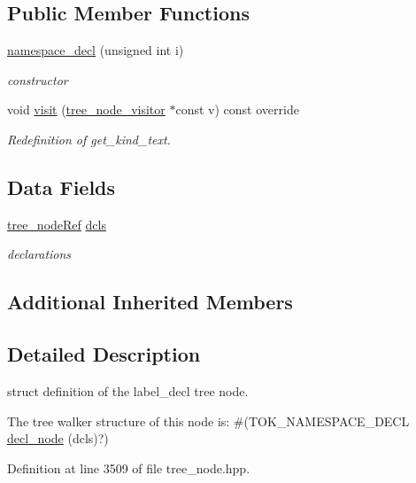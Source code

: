 \subsection*{Public Member Functions}
\begin{DoxyCompactItemize}
\item 
\hyperlink{structnamespace__decl_ab1bcc7f23f7d9c1e1831e1d453498399}{namespace\+\_\+decl} (unsigned int i)
\begin{DoxyCompactList}\small\item\em constructor \end{DoxyCompactList}\item 
void \hyperlink{structnamespace__decl_a4870e54b688ed2ab60c49d03c4362ecb}{visit} (\hyperlink{classtree__node__visitor}{tree\+\_\+node\+\_\+visitor} $\ast$const v) const override
\begin{DoxyCompactList}\small\item\em Redefinition of get\+\_\+kind\+\_\+text. \end{DoxyCompactList}\end{DoxyCompactItemize}
\subsection*{Data Fields}
\begin{DoxyCompactItemize}
\item 
\hyperlink{tree__node_8hpp_a6ee377554d1c4871ad66a337eaa67fd5}{tree\+\_\+node\+Ref} \hyperlink{structnamespace__decl_a012a041c9a99e242e39e9eca5dddb263}{dcls}
\begin{DoxyCompactList}\small\item\em declarations \end{DoxyCompactList}\end{DoxyCompactItemize}
\subsection*{Additional Inherited Members}


\subsection{Detailed Description}
struct definition of the label\+\_\+decl tree node. 

The tree walker structure of this node is\+: \#(T\+O\+K\+\_\+\+N\+A\+M\+E\+S\+P\+A\+C\+E\+\_\+\+D\+E\+CL \hyperlink{structdecl__node}{decl\+\_\+node} (dcls)?) 

Definition at line 3509 of file tree\+\_\+node.\+hpp.



